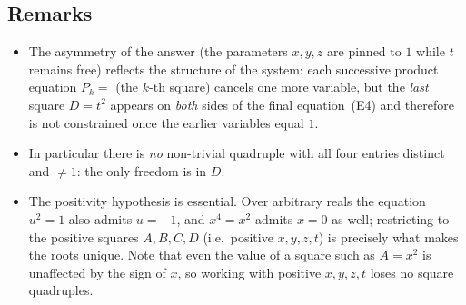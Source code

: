 \documentclass{amsart}
\begin{document}
\subsection*{Remarks}
\begin{itemize}
\item The asymmetry of the answer (the parameters $x,y,z$ are pinned to $1$ while $t$
remains free) reflects the structure of the system: each successive product equation
$P_{k}=$ (the $k$-th square) cancels one more variable, but the \emph{last} square
$D=t^2$ appears on \emph{both} sides of the final equation~(E4) and therefore is not
constrained once the earlier variables equal $1$.
\item In particular there is \emph{no} non-trivial quadruple with all four entries
distinct and $\neq 1$: the only freedom is in $D$.
\item The positivity hypothesis is essential. Over arbitrary reals the equation
$u^2=1$ also admits $u=-1$, and $x^4=x^2$ admits $x=0$ as well; restricting to the
positive squares $A,B,C,D$ (i.e.\ positive $x,y,z,t$) is precisely what makes the
roots unique. Note that even the value of a square such as $A=x^2$ is unaffected by
the sign of $x$, so working with positive $x,y,z,t$ loses no square quadruples.
\end{itemize}
\end{document}
